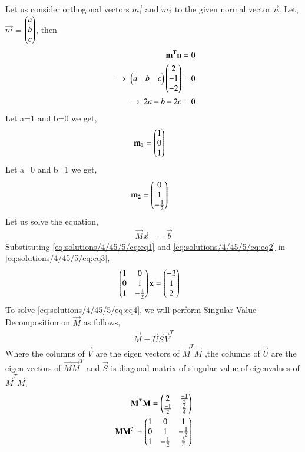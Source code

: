 Let us consider orthogonal vectors $\vec{m_1}$ and $\vec{m_2}$ to the given normal vector $\vec{n}$. Let, $\vec{m}$ = $\begin{pmatrix}a\\b\\c\end{pmatrix}$, then
\begin{align}
\mathbf{m^T}\mathbf{n} &= 0\\
\implies\begin{pmatrix}a&b&c\end{pmatrix}\begin{pmatrix}2\\-1\\-2\end{pmatrix} &= 0\\
\implies2a-b-2c &= 0
\end{align}
Let a=1 and b=0 we get,
\begin{align}
\mathbf{m_1} &= \begin{pmatrix}1\\0\\1\end{pmatrix} \label{eq:solutions/4/45/5/eq:eq1}
\end{align}
Let a=0 and b=1 we get,
\begin{align}
\mathbf{m_2} &= \begin{pmatrix}0\\1\\-\frac{1}{2}\end{pmatrix} \label{eq:solutions/4/45/5/eq:eq2}
\end{align}
Let us solve the equation,
\begin{align}
\vec{M}\vec{x} &= \vec{b}\label{eq:solutions/4/45/5/eq:eq3}
\end{align}
Substituting \eqref{eq:solutions/4/45/5/eq:eq1} and \eqref{eq:solutions/4/45/5/eq:eq2} in \eqref{eq:solutions/4/45/5/eq:eq3},
\begin{align}
    \begin{pmatrix}1&0\\0&1\\1&-\frac{1}{2}\end{pmatrix}\mathbf{x} &= \begin{pmatrix}-3\\1\\2\end{pmatrix}\label{eq:solutions/4/45/5/eq:eq4}
\end{align}
To solve \eqref{eq:solutions/4/45/5/eq:eq4}, we will perform Singular Value Decomposition on $\vec{M}$ as follows,
\begin{align}
\vec{M}=\vec{U}\vec{S}\vec{V}^T\label{eq:solutions/4/45/5/eq:eq5}
\end{align}
Where the columns of $\vec{V}$ are the eigen vectors of $\vec{M}^T\vec{M}$ ,the columns of $\vec{U}$ are the eigen vectors of $\vec{M}\vec{M}^T$ and $\vec{S}$ is diagonal matrix of singular value of eigenvalues of $\vec{M}^T\vec{M}$.
\begin{align}
\mathbf{M}^T\mathbf{M}=\begin{pmatrix}2&\frac{-1}{2}\\\frac{-1}{2}&\frac{5}{4}\end{pmatrix}\label{eq:solutions/4/45/5/eq:eq6}\\
\mathbf{M}\mathbf{M}^T=\begin{pmatrix}1&0&1\\0&1&-\frac{1}{2}\\1&-\frac{1}{2}&\frac{5}{4}\end{pmatrix}
\end{align}
